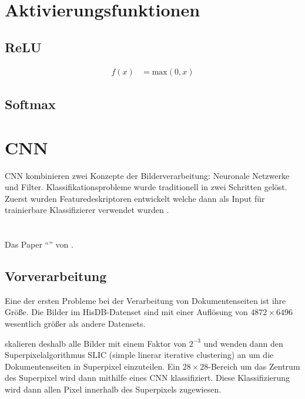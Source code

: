 \section{Aktivierungsfunktionen}
\subsection{ReLU}
\begin{align}
    f\left(x\right) &= \text{max}(0,x)
\end{align}
\subsection{Softmax}


\section{CNN}
CNN kombinieren zwei Konzepte der Bilderverarbeitung: Neuronale Netzwerke und Filter.
Klassifikationsprobleme wurde traditionell in zwei Schritten gelöst. Zuerst wurden 
Featuredeskriptoren entwickelt welche dann als Input für trainierbare Klassifizierer 
verwendet wurden \autocite[2353]{RawatDeepConvolutionalNeural2017}.

\qq{}

\section{\textcite{ChenConvolutionalNeuralNetworks2017}}
Das Paper ``'' von \citeauthor*{ChenConvolutionalNeuralNetworks2017}.

\subsection{Vorverarbeitung}
Eine der ersten Probleme bei der Verarbeitung von Dokumentenseiten ist ihre Größe.
Die Bilder im HisDB-Datenset sind mit einer Auflösung von \(4872 \times 6496\) wesentlich größer als andere Datensets.

\citeauthor{ChenConvolutionalNeuralNetworks2017} skalieren deshalb alle Bilder mit einem Faktor von  \(2^{-3}\) und wenden dann den Superpixelalgorithmus SLIC (simple linerar iterative clustering) an
\autocite{AchantaSLICSuperpixels2010} um die Dokumentenseiten in Superpixel einzuteilen.
Ein \(28 \times 28\)-Bereich um das Zentrum des Superpixel wird dann mithilfe eines CNN
klassifiziert. Diese Klassifizierung wird dann allen Pixel innerhalb des Superpixels zugewiesen.

